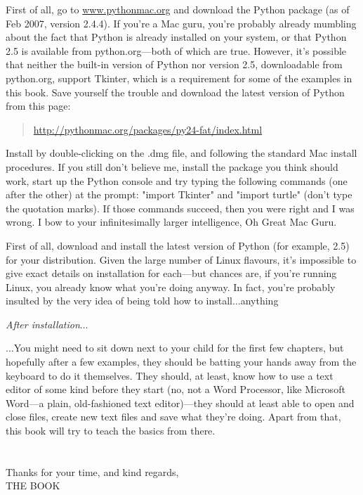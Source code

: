 \begin{MAC}

\noindent
First of all, go to \href{www.pythonmac.org}{www.pythonmac.org} and download the Python package (as of Feb 2007, version 2.4.4).  If you're a Mac guru, you're probably already mumbling about the fact that Python is already installed on your system, or that Python 2.5 is available from python.org---both of which are true.  However, it's possible that neither the built-in version of Python nor version 2.5, downloadable from python.org, support Tkinter, which is a requirement for some of the examples in this book.  Save yourself the trouble and download the latest version of Python from this page:
\begin{quote}
    \href{http://pythonmac.org/packages/py24-fat/index.html}{http://pythonmac.org/packages/py24-fat/index.html}
\end{quote}
\noindent
Install by double-clicking on the .dmg file, and following the standard Mac install procedures.
If you still don't believe me, install the package you think should work, start up the Python console and try typing the following commands (one after the other) at the prompt: "import Tkinter" and "import turtle" (don't type the quotation marks).  If those commands succeed, then you were right and I was wrong.  I bow to your infinitesimally larger intelligence, Oh Great Mac Guru.

\end{MAC}

\begin{LINUX}

\noindent
First of all, download and install the latest version of Python (for example, 2.5) for your distribution.  Given the large number of Linux flavours, it's impossible to give exact details on installation for each---but chances are, if you're running Linux, you already know what you're doing anyway.  In fact, you're probably insulted by the very idea of being told how to install$\ldots$anything

\end{LINUX}

\noindent
\emph{\color{BrickRed}After installation$\ldots$}

\noindent
$\ldots$You might need to sit down next to your child for the first few chapters, but hopefully after a few examples, they should be batting your hands away from the keyboard to do it themselves.  They should, at least, know how to use a text editor of some kind before they start (no, not a Word Processor, like Microsoft Word---a plain, old-fashioned text editor)---they should at least able to open and close files, create new text files and save what they're doing.  Apart from that, this book will try to teach the basics from there.
\\
\\
\noindent\\
Thanks for your time, and kind regards,
\noindent\\
THE BOOK